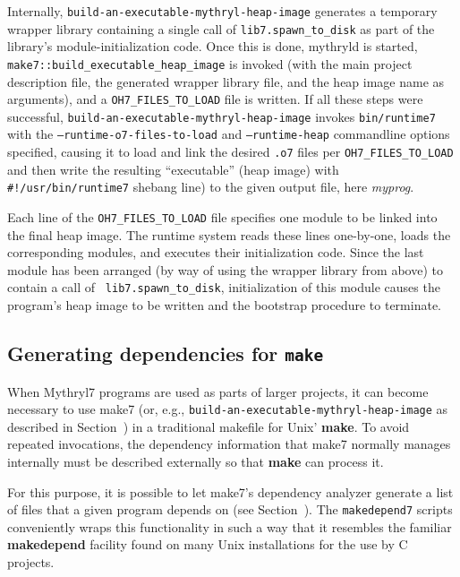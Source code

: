 Internally, {\tt build-an-executable-mythryl-heap-image} generates a temporary wrapper library
containing a single call of {\tt lib7.spawn_to_disk} as part of the
library's module-initialization code.  Once this is done, mythryld is
started, {\tt make7::build_executable_heap_image} is invoked (with the main project
description file, the generated wrapper library file, and the heap
image name as arguments), and a {\tt OH7_FILES_TO_LOAD} file is written.
If all these steps were successful, {\tt build-an-executable-mythryl-heap-image}
invokes {\tt bin/runtime7} with the {\tt --runtime-o7-files-to-load} and
{\tt --runtime-heap} commandline options specified, causing it to load and link the
desired {\tt .o7} files per {\tt OH7_FILES_TO_LOAD} and then
write the resulting ``executable'' (heap image) with {\tt #!/usr/bin/runtime7} shebang line)
to the given output file, here {\em myprog}.

Each line of the {\tt OH7_FILES_TO_LOAD} file specifies one module to be linked
into the final heap image.  The runtime system reads these
lines one-by-one, loads the corresponding modules, and executes their
initialization code.  Since the last module has been arranged (by way
of using the wrapper library from above) to contain a call of {\tt
lib7.spawn_to_disk}, initialization of this module causes the program's
heap image to be written and the bootstrap procedure to terminate.

\subsection{Generating dependencies for {\tt make}}
\label{sec:makedepend}

When Mythryl7 programs are used as parts of larger projects, it can become
necessary to use make7 (or, e.g., {\tt build-an-executable-mythryl-heap-image}
as described in Section~)
in a traditional makefile for Unix' {\bf make}.
To avoid repeated invocations, the dependency information that
make7 normally manages internally must be described externally so that
{\bf make} can process it.

For this purpose, it is possible to let make7's dependency analyzer
generate a list of files that a given program depends on (see
Section~).  The {\tt makedepend7}
scripts conveniently wraps this functionality in such a way that it
resembles the familiar {\bf makedepend} facility found on many Unix
installations for the use by C projects.


